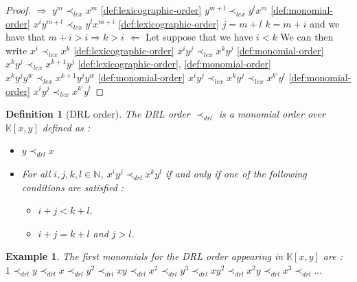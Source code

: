 \documentclass{article}
\newtheorem{definition}{Definition}[section]
\newtheorem{example}{Example}[section]
\begin{document}
\begin{proof}
    $\Rightarrow$ \newline
    $y^{m} \prec_{lex} x^{m}$ \ref{def:lexicographic-order} \newline
    $y^{m+l} \prec_{lex} y^{l}x^{m}$ \ref{def:monomial-order} \newline
    $x^{i}y^{m+l} \prec_{lex} y^{l}x^{m+i}$ \ref{def:lexicographic-order} \newline
    $j = m+l$ $ k = m + i$ and we have that $m+i>i \Rightarrow k > i$ \newline
    $\Leftarrow$ Let suppose that we have $i<k$ We can then write 
    \newline
    $x^{i}\prec_{lex} x^{k}$ \ref{def:lexicographic-order} \newline
    $x^{i}y^{j}\prec_{lex} 
    x^{k}y^{j}$ \ref{def:monomial-order}
    \newline
    $x^{k}y^{j} \prec_{lex} x^{k+1}y^{j} $ \ref{def:lexicographic-order}, \ref{def:monomial-order}
    \newline
    $x^{k}y^{j}y^{w} \prec_{lex} x^{k+1}y^{j}y^{w} $ \ref{def:monomial-order}
    \newline
    $x^{i}y^{j}\prec_{lex} 
    x^{k}y^{j}\prec_{lex} x^{k'}y^{l} $ \ref{def:monomial-order}
    \newline
    $x^{i}y^{j}\prec_{lex} x^{k'}y^{l} $
    
    
\end{proof}

\begin{definition}[DRL order]
    The DRL order $\prec_{drl}$ is a monomial order over $\mathbb{K}[x, y]$ defined as : 
    \begin{itemize}
        \item $y \prec_{drl} x$
        \item For all $i, j, k, l \in \mathbb{N}$, $x^{i}y^{j} \prec_{drl} x^{k}y^{l}$ if and only if one of the following conditions are satisfied : 
        \begin{itemize}
            \item $i + j < k + l$.
            \item $i + j = k + l$ and $j > l$.
        \end{itemize}
    \end{itemize}
\end{definition}

\begin{example}
    The first monomials for the DRL order appearing in $\mathbb{K}[x, y]$ are : \\
    $1 \prec_{drl} y \prec_{drl} x \prec_{drl} y^{2} \prec_{drl} xy \prec_{drl} x^{2} \prec_{drl} y^{3} \prec_{drl} xy^{2} \prec_{drl} x^{2} y \prec_{drl} x^{3} \prec_{drl} ...$
\end{example}
\end{document}
